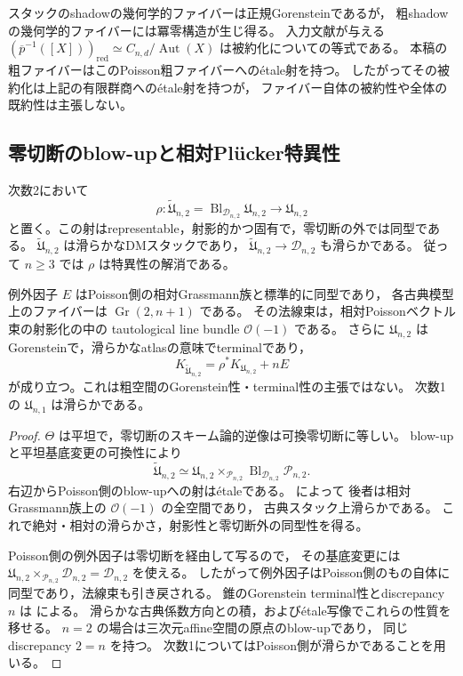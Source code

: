 \begin{remark}[粗ファイバーに残る冪零構造]
スタックのshadowの幾何学的ファイバーは正規Gorensteinであるが，
粗shadowの幾何学的ファイバーには冪零構造が生じ得る。
入力文献\cite[定理9.6]{PoissonDP}が与える
$(\overline p^{-1}([X]))_{\mathrm{red}}\simeq
C_{n,d}/\operatorname{Aut}(X)$ は被約化についての等式である。
本稿の粗ファイバーはこのPoisson粗ファイバーへの\'{e}tale射を持つ。
したがってその被約化は上記の有限群商への\'{e}tale射を持つが，
ファイバー自体の被約性や全体の既約性は主張しない。
\end{remark}

\subsection{零切断のblow-upと相対Pl\"ucker特異性}

\begin{corollary}[零切断を中心とする滑らかな解消]
\label{cor:nc-shadow-zero-blowup-resolution}
次数2において
\[
 \rho:\widetilde{\mathfrak U}_{n,2}
 =\operatorname{Bl}_{\mathcal D_{n,2}}\mathfrak U_{n,2}
 \longrightarrow\mathfrak U_{n,2}
\]
と置く。この射はrepresentable，射影的かつ固有で，零切断の外では同型である。
$\widetilde{\mathfrak U}_{n,2}$ は滑らかなDMスタックであり，
$\widetilde{\mathfrak U}_{n,2}\to\mathcal D_{n,2}$ も滑らかである。
従って $n\ge3$ では $\rho$ は特異性の解消である。

例外因子 $E$ はPoisson側の相対Grassmann族と標準的に同型であり，
各古典模型上のファイバーは $\operatorname{Gr}(2,n+1)$ である。
その法線束は，相対Poissonベクトル束の射影化の中の
tautological line bundle $\mathcal O(-1)$ である。
さらに $\mathfrak U_{n,2}$ はGorensteinで，滑らかなatlasの意味でterminalであり，
\[
 K_{\widetilde{\mathfrak U}_{n,2}}
 =\rho^*K_{\mathfrak U_{n,2}}+nE
\]
が成り立つ。これは粗空間のGorenstein性・terminal性の主張ではない。
次数1の $\mathfrak U_{n,1}$ は滑らかである。
\end{corollary}
\begin{proof}
$\Theta$ は平坦で，零切断のスキーム論的逆像は可換零切断に等しい。
blow-upと平坦基底変更の可換性\cite[Tag 0805]{StacksProject}により
\[
 \widetilde{\mathfrak U}_{n,2}
 \simeq
 \mathfrak U_{n,2}\times_{\mathcal P_{n,2}}
 \operatorname{Bl}_{\mathcal D_{n,2}}\mathcal P_{n,2}.
\]
右辺からPoisson側のblow-upへの射は\'{e}taleである。
\cite[定理10.3，\texttt{thm:poisson-resolution}]{PoissonDP}によって
後者は相対Grassmann族上の $\mathcal O(-1)$ の全空間であり，
古典スタック上滑らかである。
これで絶対・相対の滑らかさ，射影性と零切断外の同型性を得る。

Poisson側の例外因子は零切断を経由して写るので，
その基底変更には
$\mathfrak U_{n,2}\times_{\mathcal P_{n,2}}\mathcal D_{n,2}
=\mathcal D_{n,2}$ を使える。
したがって例外因子はPoisson側のもの自体に同型であり，法線束も引き戻される。
錐のGorenstein terminal性とdiscrepancy $n$ は
\cite[命題10.4，\texttt{prop:plucker-terminal}]{PoissonDP}による。
滑らかな古典係数方向との積，および\'{e}tale写像でこれらの性質を移せる。
$n=2$ の場合は三次元affine空間の原点のblow-upであり，
同じdiscrepancy $2=n$ を持つ。
次数1についてはPoisson側が滑らかであることを用いる。
\end{proof}

